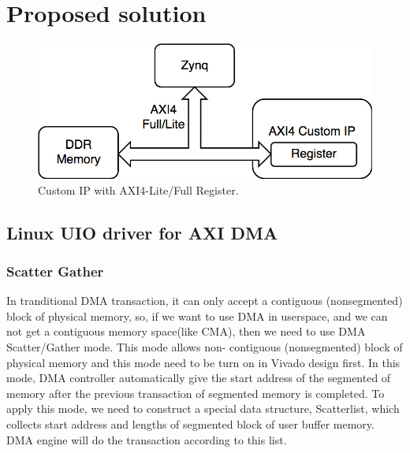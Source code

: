 
\chapter{Proposed solution }
\label{cha:proposed solution }


\begin{figure}[!htb]
  \centering
  \includegraphics[scale=0.5]{images/AXI4customIP.jpg}
  \caption[Custom IP with AXI4-Lite/Full Register.]{Custom IP with AXI4-Lite/Full Register.}
  \label{fig:Custom IP with AXI4-Lite/Full Register.}
\end{figure}


\section{Linux UIO driver for AXI DMA}
\label{sec:Linux UIO driver for AXI DMA}

\subsection{Scatter Gather}
\label{subsec:Scatter Gather}
In tranditional DMA transaction, it can only accept a contiguous (nonsegmented) block of
physical memory, so, if we want to use DMA in userspace, and we can not get a contiguous 
memory space(like CMA), then we need to use DMA Scatter/Gather mode. This mode allows non-
contiguous (nonsegmented) block of physical memory and this mode need to be turn on in Vivado 
design first. In this mode, DMA controller automatically give the start address of the 
segmented of memory after the previous transaction of segmented memory is completed. To 
apply this mode, we need to construct a special data structure, Scatterlist, which collects 
start address and lengths of segmented block of user buffer memory. DMA engine will do the
transaction according to this list. 


